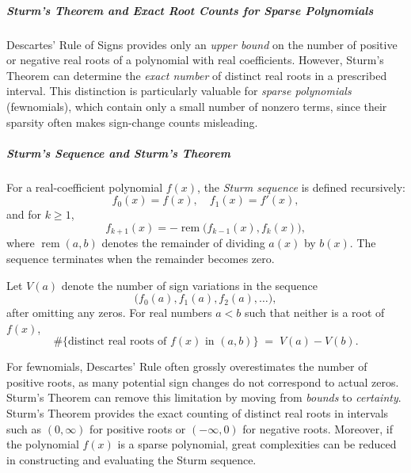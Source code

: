 \documentclass[11pt]{article}
\begin{document}
\subparagraph{Sturm’s Theorem and Exact Root Counts for Sparse Polynomials}

Descartes’ Rule of Signs provides only an \emph{upper bound} on the number of positive or negative real roots of a polynomial with real coefficients. However, Sturm’s Theorem can determine the \emph{exact number} of distinct real roots in a prescribed interval. This distinction is particularly valuable for \emph{sparse polynomials} (fewnomials), which contain only a small number of nonzero terms, since their sparsity often makes sign-change counts misleading.

\subparagraph{Sturm’s Sequence and Sturm’s Theorem~\cite{sturmfels2002solving}}
For a real-coefficient polynomial \(f(x)\), the \emph{Sturm sequence} is defined recursively:
\[
f_0(x) = f(x), \quad f_1(x) = f'(x),
\]
and for \(k \geq 1\),
\[
f_{k+1}(x) = - \operatorname{rem}\!\big(f_{k-1}(x), f_k(x)\big),
\]
where \(\operatorname{rem}(a,b)\) denotes the remainder of dividing \(a(x)\) by \(b(x)\). The sequence terminates when the remainder becomes zero.

Let \(V(a)\) denote the number of sign variations in the sequence
\[
\big(f_0(a), f_1(a), f_2(a), \dots \big),
\]
after omitting any zeros. For real numbers \(a < b\) such that neither is a root of \(f(x)\),
\[
\#\{\text{distinct real roots of } f(x) \text{ in } (a,b)\} \;=\; V(a) - V(b).
\]

For fewnomials, Descartes’ Rule often grossly overestimates the number of positive roots, as many potential sign changes do not correspond to actual zeros. Sturm’s Theorem can remove this limitation by moving from \emph{bounds} to \emph{certainty}. Sturm’s Theorem provides the exact counting of distinct real roots in intervals such as \((0,\infty)\) for positive roots or \((-\infty,0)\) for negative roots. Moreover, if the polynomial $f(x)$ is a sparse polynomial, great complexities can be reduced in constructing and evaluating the Sturm sequence.
\end{document}
